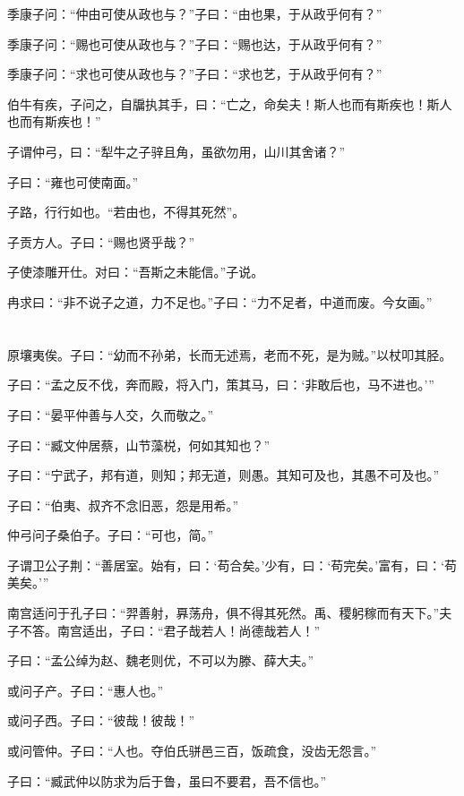 \documentclass[a5paper]{ctexbook}
\begin{document}
    季康子问：“仲由可使从政也与？”子曰：“由也果，于从政乎何有？” 
    
    季康子问：“赐也可使从政也与？”子曰：“赐也达，于从政乎何有？” 
    
    季康子问：“求也可使从政也与？”子曰：“求也艺，于从政乎何有？”

    伯牛有疾，子问之，自牖执其手，曰：“亡之，命矣夫！斯人也而有斯疾也！斯人也而有斯疾也！”

    子谓仲弓，曰：“犁牛之子骍且角，虽欲勿用，山川其舍诸？”

    子曰：“雍也可使南面。”

    子路，行行如也。“若由也，不得其死然”。

    子贡方人。子曰：“赐也贤乎哉？”

    子使漆雕开仕。对曰：“吾斯之未能信。”子说。

    冉求曰：“非不说子之道，力不足也。”子曰：“力不足者，中道而废。今女画。”

    \chapter{}

    原壤夷俟。子曰：“幼而不孙弟，长而无述焉，老而不死，是为贼。”以杖叩其胫。

    子曰：“孟之反不伐，奔而殿，将入门，策其马，曰：‘非敢后也，马不进也。’”

    子曰：“晏平仲善与人交，久而敬之。”

    子曰：“臧文仲居蔡，山节藻棁，何如其知也？”

    子曰：“宁武子，邦有道，则知；邦无道，则愚。其知可及也，其愚不可及也。”

    子曰：“伯夷、叔齐不念旧恶，怨是用希。”

    仲弓问子桑伯子。子曰：“可也，简。”

    子谓卫公子荆：“善居室。始有，曰：‘苟合矣。’少有，曰：‘苟完矣。’富有，曰：‘苟美矣。’”

    南宫适问于孔子曰：“羿善射，奡荡舟，俱不得其死然。禹、稷躬稼而有天下。”夫子不答。南宫适出，子曰：“君子哉若人！尚德哉若人！”

    子曰：“孟公绰为赵、魏老则优，不可以为滕、薛大夫。”

    或问子产。子曰：“惠人也。”
    
    或问子西。子曰：“彼哉！彼哉！”

    或问管仲。子曰：“人也。夺伯氏骈邑三百，饭疏食，没齿无怨言。”

    子曰：“臧武仲以防求为后于鲁，虽曰不要君，吾不信也。”
\end{document}
